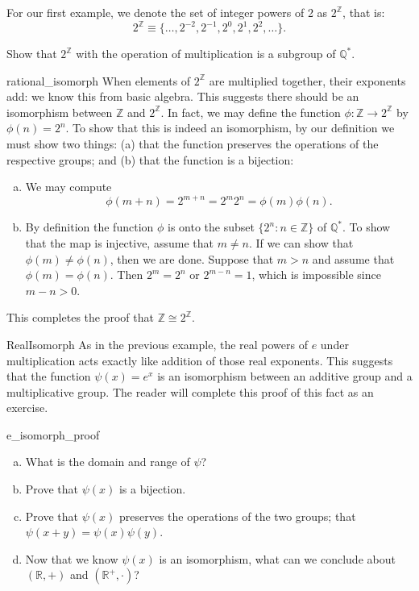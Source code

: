 For our first example, we   denote the set of integer powers of 2 as $2^{\mathbb Z}$, that is:
\[ 2^{\mathbb Z} \equiv \{\ldots, 2^{-2}, 2^{-1}, 2^0, 2^1, 2^2, \ldots\}. \]
\begin{exercise}{}
Show that $2^{\mathbb Z}$ with the operation of multiplication is a subgroup of ${\mathbb Q}^{\ast}$.
\end{exercise}

\begin{example}{rational_isomorph}
When elements of $2^{\mathbb Z}$ are multiplied together, their exponents add: we know this from basic algebra. This suggests there should be an isomorphism between ${\mathbb Z}$ and   $2^{\mathbb Z}$. In fact, we may define the function
$\phi: {\mathbb Z} \rightarrow 2^{\mathbb Z}$ by $\phi( n ) = 2^n$.
To show that this is indeed an isomorphism, by our definition we must show two things: (a)  that the function preserves the operations of the respective groups; and (b) that the function is a bijection:
\begin{enumerate}[(a)] 
\item
We may compute
\[
\phi( m + n ) = 2^{m + n} = 2^m 2^n = \phi( m ) \phi( n ).
\]
\item
By definition the function $\phi$ is onto the subset $\{2^n :n \in {\mathbb Z} \}$ of  ${\mathbb Q}^\ast$.  To show that the map is injective, assume that $m \neq n$.  If we can show that $\phi(m) \neq \phi(n)$, then we are done.  Suppose that $m>n$ and assume that $\phi(m) = \phi(n)$.  Then $2^m = 2^n$ or $2^{m-n} = 1$, which is impossible since $m-n>0$. 
\end{enumerate}

This completes the proof that $ {\mathbb Z} \cong 2^{\mathbb Z}$.
\end{example}      

 
\begin{example}{RealIsomorph}
As in the previous example, the real powers of $e$ under multiplication acts exactly like addition of those real exponents.  
This suggests that the function $\psi(x)=e^x$ is an isomorphism between an additive group and a multiplicative group.  The reader will complete this proof of this fact as an exercise.  
\end{example}

\begin{exercise}{e_isomorph_proof}
\begin{enumerate}[(a)]
\item
What is the domain and range of $\psi$?
\item
Prove that $\psi(x)$ is a bijection.
\item
Prove that $\psi(x)$ preserves the operations of the two groups; that $\psi(x + y) = \psi(x)\psi(y)$.
\item
Now that we know $\psi(x)$ is an isomorphism, what can we conclude about $({\mathbb R},+)$ and $({\mathbb R}^+,\cdot)$?
\end{enumerate}
\end{exercise}

